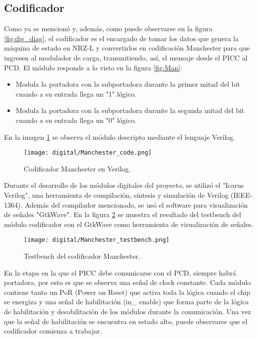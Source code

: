 \subsection{Codificador}
Como ya se mencionó y, además, como puede observarse en la figura \ref{fig:dig_diag}, el codificador es el encargado de tomar los datos que genera la máquina de estado en NRZ-L y convertirlos en codificación Manchester para que ingresen al modulador de carga, transmitiendo, así, el mensaje desde el PICC al PCD.
El módulo responde a lo visto en la figura \ref{fig:Man}:
\begin{itemize}
\item Modula la portadora con la subportadora durante la primer mitad del bit cuando a su entrada llega un "1" lógico.
\item Modula la portadora con la subportadora durante la segunda mitad del bit cuando a su entrada llega un "0" lógico.
\end{itemize}
En la imagen \ref{fig:manch_code} se observa el módulo descripto mediante el lenguaje Verilog.

\begin{figure}[H]
\centering
\texttt{[image: digital/Manchester\_code.png]}
\caption{Codificador Manchester en Verilog.}
\label{fig:manch_code}
\end{figure}

Durante el desarrollo de los módulos digitales del proyecto, se utilizó el "Icarus Verilog", una herramienta de compilación, síntesis y simulación de Verilog (IEEE-1364). Además del compilador mencionado, se usó el software para visualización de señales "GtkWave".
En la figura \ref{fig:manch_test} se muestra el resultado del testbench del módulo codificador con el GtkWave como herramienta de visualización de señales.

\begin{figure}[H]
\centering
\texttt{[image: digital/Manchester\_testbench.png]}
\caption{Testbench del codificador Manchester.}
\label{fig:manch_test}
\end{figure}

En la etapa en la que el PICC debe comunicarse con el PCD, siempre habrá portadora, por esto es que se observa una señal de clock constante. Cada módulo contiene tanto un PoR (Power on Reset) que activa toda la lógica cuando el chip se energiza y una señal de habilitación (in\_ enable) que forma parte de la lógica de habilitación y desabilitación de los módulos durante la comunicación.
Una vez que la señal de habilitación se encuentra en estado alto, puede observarse que el codificador comienza a trabajar.

